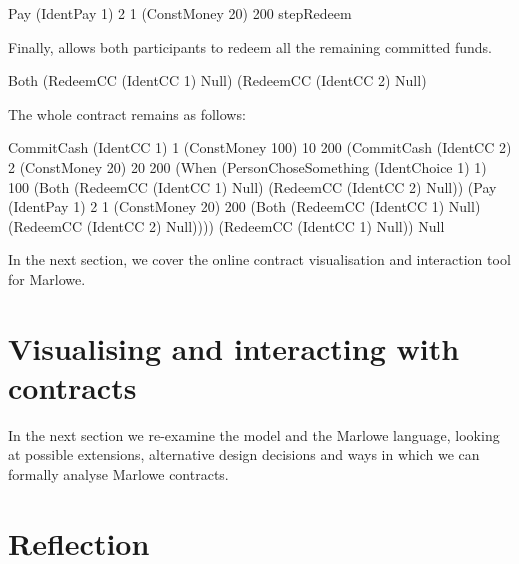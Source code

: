 \documentclass[
      acmsmall
    , screen
    , review=true
  ]{acmart}
\begin{document}
\begin{haskellcode}
Pay (IdentPay 1) 2 1 (ConstMoney 20) 200 stepRedeem
\end{haskellcode}

Finally,  allows both participants to redeem all the remaining committed funds.

\begin{haskellcode}
Both (RedeemCC (IdentCC 1) Null)
     (RedeemCC (IdentCC 2) Null)
\end{haskellcode}

The whole contract remains as follows:
\begin{haskellcode}
CommitCash (IdentCC 1) 1
           (ConstMoney 100)
           10 200
           (CommitCash (IdentCC 2) 2
                       (ConstMoney 20)
                       20 200
                       (When (PersonChoseSomething (IdentChoice 1) 1)
                             100
                             (Both (RedeemCC (IdentCC 1) Null)
                                   (RedeemCC (IdentCC 2) Null))
                             (Pay (IdentPay 1) 2 1
                                  (ConstMoney 20)
                                  200
                                  (Both (RedeemCC (IdentCC 1) Null)
                                        (RedeemCC (IdentCC 2) Null))))
                       (RedeemCC (IdentCC 1) Null))
           Null
\end{haskellcode}
In the next section, we cover the online contract visualisation and interaction tool for Marlowe.

\section{Visualising and interacting with contracts}
\label{section:tool}



In the next section we re-examine the model and the Marlowe language, looking at possible extensions, alternative design decisions and ways in which we can formally analyse Marlowe contracts.

\section{Reflection}
\label{section:reflection}
\end{document}
